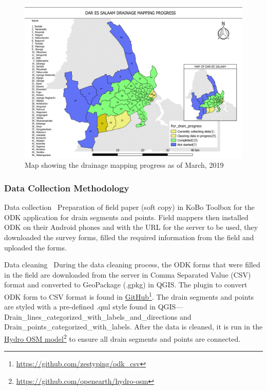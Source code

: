 \documentclass[a4paper,12pt,twoside]{article}
\begin{document}
\begin{figure}[h]
  \color{RHgreen}\caption{Map showing the drainage mapping progress as of March, 2019}
  \centering
  \includegraphics[width=1\textwidth]{images/Dar_drainage_mapping_progress.png}
\end{figure}

\subsubsection{Data Collection Methodology}
\begin{multicols}{2}
{\color{RHblue} Data collection}
\
Preparation of field paper (soft copy) in KoBo Toolbox for the ODK application for drain segments and points. Field mappers then installed ODK on their Android phones and with the URL for the server to be used, they downloaded the survey forms, filled the required information from the field and uploaded the forms.

{\color{RHblue} Data cleaning}
\
During the data cleaning process, the ODK forms that were filled in the field are downloaded from the server in Comma Separated Value (CSV) format and converted to GeoPackage (.gpkg) in QGIS. The plugin to convert ODK form to CSV format is found in \href{https://github.com/zestyping/odk_csv}{GitHub}\footnote{\url{https://github.com/zestyping/odk\_csv}}. The drain segments and points are styled with a pre-defined .qml style found in QGIS---Drain\_lines\_categorized\_with\_labels\_and\_directions and Drain\_points\_categorized\_with\_labels. After the data is cleaned, it is run in the \href{https://github.com/openearth/hydro-osm}{Hydro OSM model}\footnote{\url{https://github.com/openearth/hydro-osm}} to ensure all drain segments and points are connected.
\end{multicols}
\end{document}
